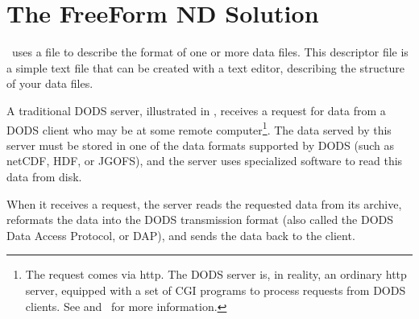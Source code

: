 


  
  

\section{The FreeForm ND Solution}

\ffnd\ uses a  file to describe the format
of one or more data files.  This descriptor file is a simple text file
that can be created with a text editor, describing the structure of
your data files.  

A traditional DODS server, illustrated in ,
receives a request for data from a DODS client who may be at some
remote computer\footnote{The request comes via http.  The DODS server is, in
reality, an ordinary http server, equipped with a set of CGI programs
to process requests from DODS clients. See  and
\DODSuser\ for more information.}.  The data served by this server
must be stored in one of the data formats supported by DODS (such as
netCDF, HDF, or JGOFS), and the server uses specialized software to
read this data from disk.

When it receives a request, the server reads the requested data from its
archive, reformats the data into the DODS transmission format (also
called the DODS Data Access Protocol, or DAP), and sends the data back
to the client.

